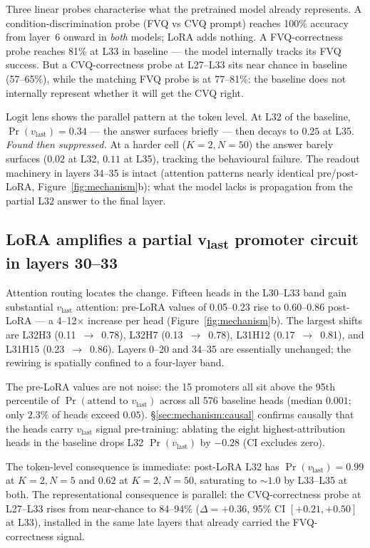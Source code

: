 \documentclass[11pt]{article}
\begin{document}
Three linear probes characterise what the pretrained model already
represents. A condition-discrimination probe (FVQ vs CVQ prompt)
reaches 100\% accuracy from layer~6 onward in \emph{both} models;
LoRA adds nothing. A FVQ-correctness probe reaches 81\% at L33 in
baseline --- the model internally tracks its FVQ success. But a
CVQ-correctness probe at L27--L33 sits near chance in baseline
(57--65\%), while the matching FVQ probe is at 77--81\%: the
baseline does not internally represent whether it will get the CVQ
right.

Logit lens shows the parallel pattern at the token level. At L32
of the baseline, $\Pr(v_{\text{last}}){=}0.34$ --- the answer
surfaces briefly --- then decays to $0.25$ at L35.
\emph{Found then suppressed.} At a harder cell ($K{=}2, N{=}50$)
the answer barely surfaces ($0.02$ at L32, $0.11$ at L35),
tracking the behavioural failure. The readout machinery in layers
34--35 is intact (attention patterns nearly identical pre/post-LoRA,
Figure~\ref{fig:mechanism}b); what the model lacks is propagation
from the partial L32 answer to the final layer.

\subsection{LoRA amplifies a partial v\textsubscript{last} promoter
circuit in layers 30--33}
\label{sec:mechanism:promoter}

Attention routing locates the change. Fifteen heads in the
L30--L33 band gain substantial $v_{\text{last}}$ attention:
pre-LoRA values of 0.05--0.23 rise to 0.60--0.86 post-LoRA --- a
4--12$\times$ increase per head (Figure~\ref{fig:mechanism}b). The
largest shifts are L32H3 (0.11~$\to$~0.78), L32H7
(0.13~$\to$~0.78), L31H12 (0.17~$\to$~0.81), and L31H15
(0.23~$\to$~0.86). Layers 0--20 and 34--35 are essentially
unchanged; the rewiring is spatially confined to a four-layer band.

The pre-LoRA values are not noise: the 15 promoters all sit above
the 95th percentile of $\Pr(\text{attend to }v_{\text{last}})$
across all 576 baseline heads (median $0.001$; only $2.3\%$ of
heads exceed $0.05$).
\S\ref{sec:mechanism:causal} confirms causally that the heads
carry $v_{\text{last}}$ signal pre-training: ablating the eight
highest-attribution heads in the baseline drops L32
$\Pr(v_{\text{last}})$ by $-0.28$ (CI excludes zero).

The token-level consequence is immediate: post-LoRA L32 has
$\Pr(v_{\text{last}}) {=} 0.99$ at $K{=}2, N{=}5$ and $0.62$ at
$K{=}2, N{=}50$, saturating to $\sim 1.0$ by L33--L35 at both.
The representational consequence is parallel: the CVQ-correctness
probe at L27--L33 rises from near-chance to 84--94\% ($\Delta
{=} {+}0.36$, 95\% CI $[+0.21, +0.50]$ at L33), installed in the
same late layers that already carried the FVQ-correctness signal.
\end{document}
